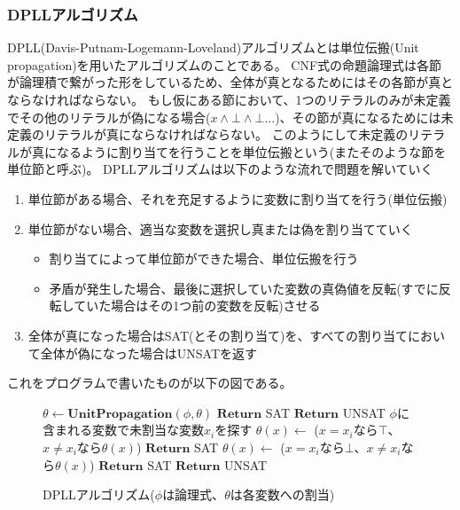 \documentclass[titlepage]{jsarticle}
\begin{document}
\subsubsection{DPLLアルゴリズム}
DPLL(Davis-Putnam-Logemann-Loveland)アルゴリズムとは単位伝搬(Unit propagation)を用いたアルゴリズムのことである。
CNF式の命題論理式は各節が論理積で繋がった形をしているため、全体が真となるためにはその各節が真とならなければならない。
もし仮にある節において、1つのリテラルのみが未定義でその他のリテラルが偽になる場合($x \land \bot \land \bot ...$)、その節が真になるためには未定義のリテラルが真にならなければならない。
このようにして未定義のリテラルが真になるように割り当てを行うことを単位伝搬という(またそのような節を単位節と呼ぶ)。
DPLLアルゴリズムは以下のような流れで問題を解いていく
\begin{enumerate}
	\item 単位節がある場合、それを充足するように変数に割り当てを行う(単位伝搬)
	\item 単位節がない場合、適当な変数を選択し真または偽を割り当てていく
	\begin{itemize}
		\item 割り当てによって単位節ができた場合、単位伝搬を行う
		\item 矛盾が発生した場合、最後に選択していた変数の真偽値を反転(すでに反転していた場合はその1つ前の変数を反転)させる
	\end{itemize}
	\item 全体が真になった場合はSAT(とその割り当て)を、すべての割り当てにおいて全体が偽になった場合はUNSATを返す
\end{enumerate}

これをプログラムで書いたものが以下の図である。

\begin{figure}[!t]
\begin{algorithm}[H]
	\begin{algorithmic}[1]
			\State $\theta \gets \mathbf{UnitPropagation}(\phi, \theta)$
				\State $\mathbf{Return}$ SAT
				\State $\mathbf{Return}$ UNSAT
			\Else
				\State $\phi$に含まれる変数で未割当な変数$x_i$を探す
				\State $\theta (x) \gets$ ($x=x_i$なら$\top$、$x \neq x_i$なら$\theta (x)$)
					\State $\mathbf{Return}$ SAT
				\EndIf 
				\State $\theta (x) \gets$ ($x=x_i$なら$\bot$、$x \neq x_i$なら$\theta (x)$)
					\State $\mathbf{Return}$ SAT
				\EndIf
				\State $\mathbf{Return}$ UNSAT
			\EndIf
		\EndFunction
	\end{algorithmic}
\end{algorithm}
\caption{DPLLアルゴリズム($\phi$は論理式、$\theta$は各変数への割当)}
\end{figure}
\end{document}

